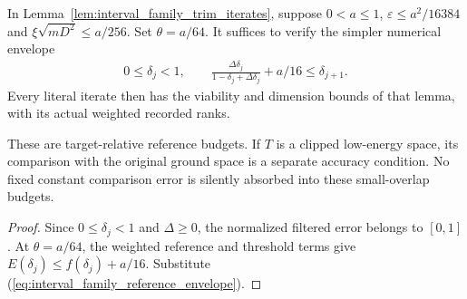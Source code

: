 \begin{lemma}
    \label{lem:interval_family_trim_reference_budget}
    \leanok
    In Lemma~\ref{lem:interval_family_trim_iterates}, suppose $0<a\le1$,
    $\varepsilon\le a^2/16384$ and
    $\xi\sqrt{mD^2}\le a/256$. Set $\theta=a/64$. It suffices to verify
    the simpler numerical envelope
    \begin{align}
        0\le\delta_j<1,\qquad
        \frac{\Delta\delta_j}{1-\delta_j+\Delta\delta_j}+a/16
        \le\delta_{j+1}.
        \label{eq:interval_family_reference_envelope}
    \end{align}
    Every literal iterate then has the viability and dimension bounds
    of that lemma, with its actual weighted recorded ranks.

    These are target-relative reference budgets. If $T$ is a clipped
    low-energy space, its comparison with the original ground space is a
    separate accuracy condition. No fixed constant comparison error is
    silently absorbed into these small-overlap budgets.
\end{lemma}
\begin{proof}\leanok
    Since $0\le\delta_j<1$ and $\Delta\ge0$, the normalized filtered error
    belongs to $[0,1]$. At $\theta=a/64$, the weighted reference and
    threshold terms give $E(\delta_j)\le f(\delta_j)+a/16$.
    Substitute (\ref{eq:interval_family_reference_envelope}).
\end{proof}


